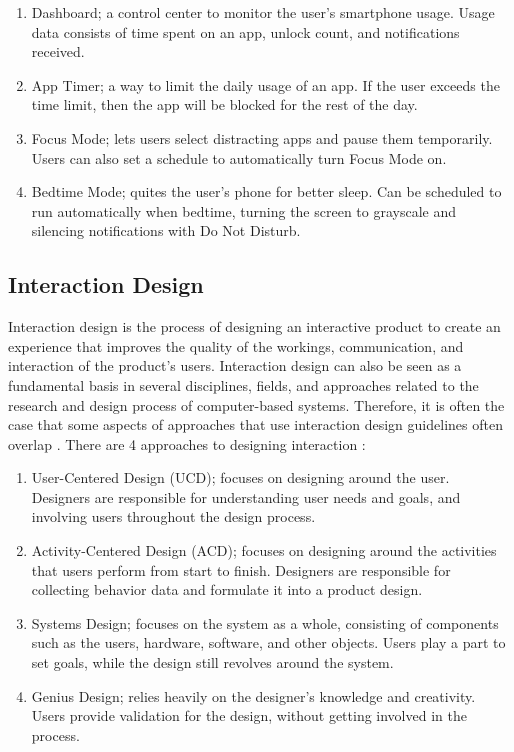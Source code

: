 \documentclass[conference]{IEEEtran}
\begin{document}
\begin{enumerate}
  \item Dashboard; a control center to monitor the user's smartphone usage. Usage data consists of time spent on an app, unlock count, and notifications received. 
  \item App Timer; a way to limit the daily usage of an app. If the user exceeds the time limit, then the app will be blocked for the rest of the day.
  \item Focus Mode; lets users select distracting apps and pause them temporarily. Users can also set a schedule to automatically turn Focus Mode on.
  \item Bedtime Mode; quites the user's phone for better sleep. Can be scheduled to run automatically when bedtime, turning the screen to grayscale and silencing notifications with Do Not Disturb.
\end{enumerate}

\subsection{Interaction Design}

Interaction design is the process of designing an interactive product to create an experience that improves the quality of the workings, communication, and interaction of the product's users. Interaction design can also be seen as a fundamental basis in several disciplines, fields, and approaches related to the research and design process of computer-based systems. Therefore, it is often the case that some aspects of approaches that use interaction design guidelines often overlap \cite{PreeceRogersSharp15}. There are 4 approaches to designing interaction \cite{saffer2010designing}:

\begin{enumerate}
  \item User-Centered Design (UCD); focuses on designing around the user. Designers are responsible for understanding user needs and goals, and involving users throughout the design process.
  \item Activity-Centered Design (ACD); focuses on designing around the activities that users perform from start to finish. Designers are responsible for collecting behavior data and formulate it into a product design.
  \item Systems Design; focuses on the system as a whole, consisting of components such as the users, hardware, software, and other objects. Users play a part to set goals, while the design still revolves around the system.
  \item Genius Design; relies heavily on the designer's knowledge and creativity. Users provide validation for the design, without getting involved in the process.
\end{enumerate}
\end{document}
